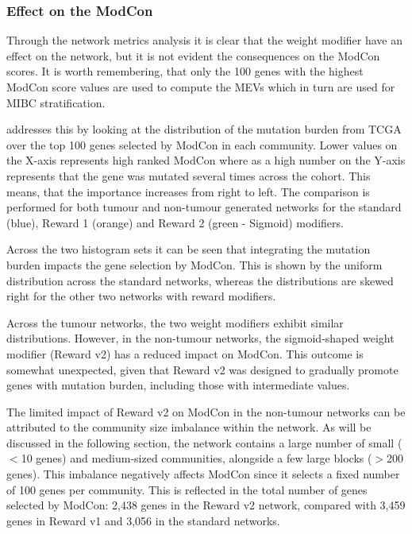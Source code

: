 \subsubsection*{Effect on the ModCon}

Through the network metrics analysis it is clear that the weight modifier have an effect on the network, but it is not evident the consequences on the ModCon scores. It is worth remembering, that only the 100 genes with the highest ModCon score values are used to compute the MEVs which in turn are used for MIBC stratification.

 addresses this by looking at the distribution of the mutation burden from TCGA over the top 100 genes selected by ModCon in each community. Lower values on the X-axis represents high ranked ModCon where as a high number on the Y-axis represents that the gene was mutated several times across the cohort. This means, that the importance increases from right to left. The comparison is performed for both tumour and non-tumour generated networks for the standard (blue), Reward 1 (orange) and Reward 2 (green - Sigmoid) modifiers.

Across the two histogram sets it can be seen that integrating the mutation burden impacts the gene selection by ModCon. This is shown by the uniform distribution across the standard networks, whereas the distributions are skewed right for the other two networks with reward modifiers.

Across the tumour networks, the two weight modifiers exhibit similar distributions. However, in the non-tumour networks, the sigmoid-shaped weight modifier (Reward v2) has a reduced impact on ModCon. This outcome is somewhat unexpected, given that Reward v2 was designed to gradually promote genes with mutation burden, including those with intermediate values.

The limited impact of Reward v2 on ModCon in the non-tumour networks can be attributed to the community size imbalance within the network. As will be discussed in the following section, the network contains a large number of small ($<$10 genes) and medium-sized communities, alongside a few large blocks ($>$200 genes). This imbalance negatively affects ModCon since it selects a fixed number of 100 genes per community. This is reflected in the total number of genes selected by ModCon: 2,438 genes in the Reward v2 network, compared with 3,459 genes in Reward v1 and 3,056 in the standard networks.

